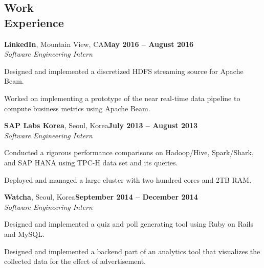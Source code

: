 \documentclass[10pt,margin,line]{resume}
\begin{document}
\begin{resume}
\section{\mysidestyle Work\\Experience}

\textbf{LinkedIn}, Mountain View, CA\hfill \textbf{May 2016 -- August 2016} \vspace{0mm}\\\vspace{0mm}%
\textsl{Software Engineering Intern}
\vspace{-3mm}\\\vspace{-1mm}%
\begin{list3}
    \item Designed and implemented a discretized HDFS streaming source for Apache Beam.
    \item Worked on implementing a prototype of the near real-time data pipeline to compute business metrics using Apache Beam.
\end{list3}


\textbf{SAP Labs Korea}, Seoul, Korea\hfill \textbf{July 2013 -- August 2013} \vspace{0mm}\\\vspace{0mm}%
\textsl{Software Engineering Intern}
\vspace{-3mm}\\\vspace{-1mm}%
\begin{list3}
    \item Conducted a rigorous performance comparisons on Hadoop/Hive, Spark/Shark, and SAP HANA using TPC-H data set and its queries.
    \item Deployed and managed a large cluster with two hundred cores and 2TB RAM.
\end{list3}

\textbf{Watcha}, Seoul, Korea\hfill \textbf{September 2014 -- December 2014} \vspace{0mm}\\\vspace{0mm}%
\textsl{Software Engineering Intern}
\vspace{-3mm}\\\vspace{-1mm}%
\begin{list3}
    \item Designed and implemented a quiz and poll generating tool using Ruby on Rails and MySQL.
    \item Designed and implemented a backend part of an analytics tool that visualizes the collected data for the effect of advertisement.
\end{list3}


\end{resume}
\end{document}

